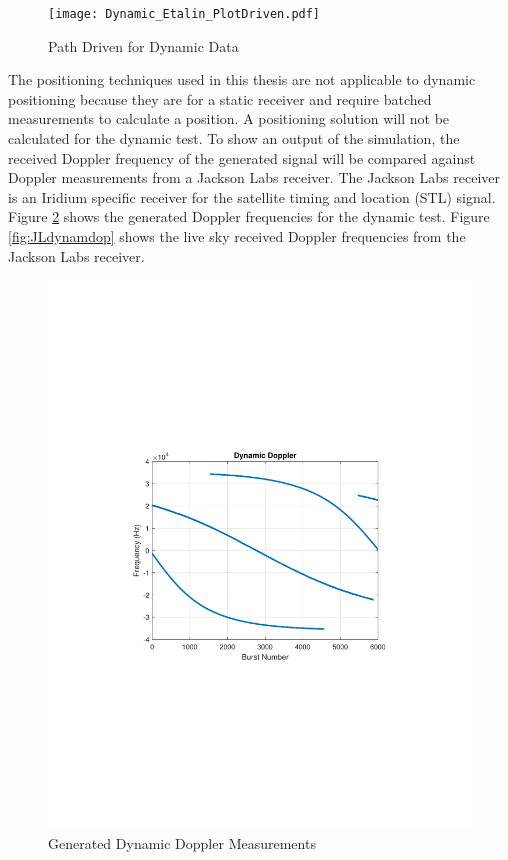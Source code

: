 \documentclass[12pt]{report}
\begin{document}
\begin{figure}[h!]
    \centering
    \texttt{[image: Dynamic\_Etalin\_PlotDriven.pdf]}
    \caption{Path Driven for Dynamic Data}
    \label{fig:Dynamicpath}
\end{figure}

The positioning techniques used in this thesis are not applicable to dynamic positioning because they are for a static receiver and require batched measurements to calculate a position. A positioning solution will not be calculated for the dynamic test. To show an output of the simulation, the received Doppler frequency of the generated signal will be compared against Doppler measurements from a Jackson Labs receiver. The Jackson Labs receiver is an Iridium specific receiver for the satellite timing and location (STL) signal. Figure \ref{fig:gendynamdop} shows the generated Doppler frequencies for the dynamic test. Figure \ref{fig:JLdynamdop} shows the live sky received Doppler frequencies from the Jackson Labs receiver.

\begin{figure}[h!]
    \centering
    \includegraphics[trim=1.2in 3.3in 1.75in 3.3in,clip,width=5in]
    {Dynamic_Irid_Doppler-2.pdf}
    \caption{Generated Dynamic Doppler Measurements}
    \label{fig:gendynamdop}
\end{figure}
\end{document}
